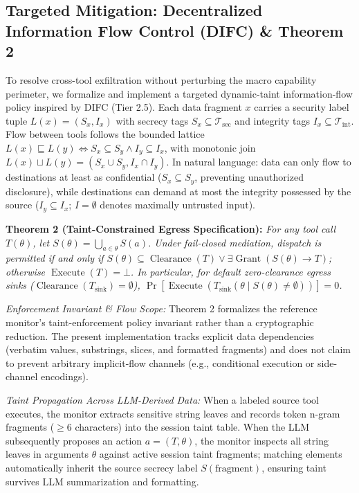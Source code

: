 \documentclass[10pt,journal,compsoc]{IEEEtran}
\begin{document}
\subsection{Targeted Mitigation: Decentralized Information Flow Control (DIFC) \& Theorem 2}
To resolve cross-tool exfiltration without perturbing the macro capability perimeter, we formalize and implement a targeted dynamic-taint information-flow policy inspired by DIFC (Tier 2.5). Each data fragment $x$ carries a security label tuple $L(x) = (S_x, I_x)$ with secrecy tags $S_x \subseteq \mathcal{T}_{\text{sec}}$ and integrity tags $I_x \subseteq \mathcal{T}_{\text{int}}$. Flow between tools follows the bounded lattice $L(x) \sqsubseteq L(y) \iff S_x \subseteq S_y \land I_y \subseteq I_x$, with monotonic join $L(x) \sqcup L(y) = (S_x \cup S_y, I_x \cap I_y)$. In natural language: data can only flow to destinations at least as confidential ($S_x \subseteq S_y$, preventing unauthorized disclosure), while destinations can demand at most the integrity possessed by the source ($I_y \subseteq I_x$; $I = \emptyset$ denotes maximally untrusted input).

\noindent\textbf{Theorem 2 (Taint-Constrained Egress Specification):} \textit{For any tool call $T(\theta)$, let $S(\theta) = \bigcup_{a \in \theta} S(a)$. Under fail-closed mediation, dispatch is permitted if and only if $S(\theta) \subseteq \operatorname{Clearance}(T) \lor \exists \operatorname{Grant}(S(\theta) \to T)$; otherwise $\operatorname{Execute}(T) = \bot$. In particular, for default zero-clearance egress sinks ($\operatorname{Clearance}(T_{\text{sink}}) = \emptyset$), $\Pr[\operatorname{Execute}(T_{\text{sink}}(\theta \mid S(\theta) \neq \emptyset))] = 0$.}

\noindent\textit{Enforcement Invariant \& Flow Scope:} Theorem 2 formalizes the reference monitor's taint-enforcement policy invariant rather than a cryptographic reduction. The present implementation tracks explicit data dependencies (verbatim values, substrings, slices, and formatted fragments) and does not claim to prevent arbitrary implicit-flow channels (e.g., conditional execution or side-channel encodings).

\noindent\textit{Taint Propagation Across LLM-Derived Data:} When a labeled source tool executes, the monitor extracts sensitive string leaves and records token n-gram fragments ($\ge 6$ characters) into the session taint table. When the LLM subsequently proposes an action $a = (T, \theta)$, the monitor inspects all string leaves in arguments $\theta$ against active session taint fragments; matching elements automatically inherit the source secrecy label $S(\text{fragment})$, ensuring taint survives LLM summarization and formatting.
\end{document}

